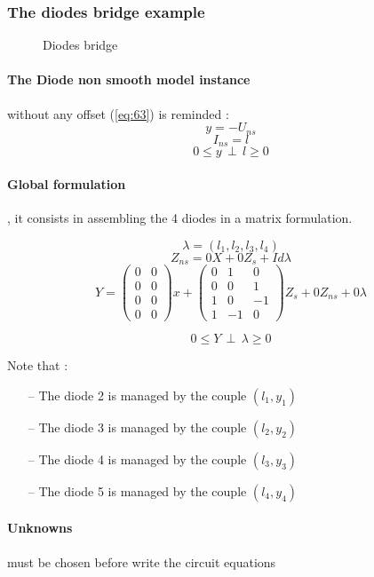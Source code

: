 \subsubsection{The diodes bridge example}

\begin{figure}[h]
\centerline{
 \scalebox{0.7}{
    
 }
}
 \caption{Diodes bridge}
\label{fig-Diode-bridge}
\end{figure}





\paragraph{The Diode non smooth model instance} without any offset (\ref{eq:63}) is reminded :
\[ y = -U_{ns}\]
\[ I_{ns} = l \]
\[0 \leq y \, \perp \, l \geq 0\]


\paragraph{Global formulation}, it consists in assembling the 4 diodes in a matrix formulation.

\[ \lambda =(l_{1},l_{2},l_{3},l_{4})\]
\[Z_{ns}=0X+0Z_{s}+Id\lambda\]
\[Y=\left(\begin{array}{cc}
0&0\\
0&0\\
0&0\\
0&0\end{array}\right) x+
\left(\begin{array}{ccc}
0&1&0\\
0&0&1\\
1&0&-1\\
1&-1&0\end{array}
\right) Z_{s} + 0Z_{ns} +0\lambda\]

\[0 \leq Y \, \perp \, \lambda \geq 0\]

Note that :
\begin{itemize}

  \item[--] The diode 2 is managed by the couple $(l_1,y_1)$
  \item[--] The diode 3 is managed by the couple $(l_2,y_2)$
  \item[--] The diode 4 is managed by the couple $(l_3,y_3)$
  \item[--] The diode 5 is managed by the couple $(l_4,y_4)$
\end{itemize}
\paragraph{Unknowns} must be chosen before write the circuit equations

